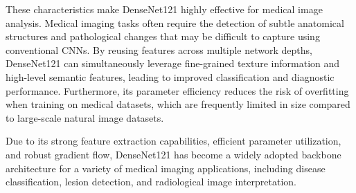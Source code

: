 These characteristics make DenseNet121 highly effective for medical image analysis. Medical imaging tasks often require the detection of subtle anatomical structures and pathological changes that may be difficult to capture using conventional CNNs. By reusing features across multiple network depths, DenseNet121 can simultaneously leverage fine-grained texture information and high-level semantic features, leading to improved classification and diagnostic performance. Furthermore, its parameter efficiency reduces the risk of overfitting when training on medical datasets, which are frequently limited in size compared to large-scale natural image datasets.

Due to its strong feature extraction capabilities, efficient parameter utilization, and robust gradient flow, DenseNet121 has become a widely adopted backbone architecture for a variety of medical imaging applications, including disease classification, lesion detection, and radiological image interpretation.